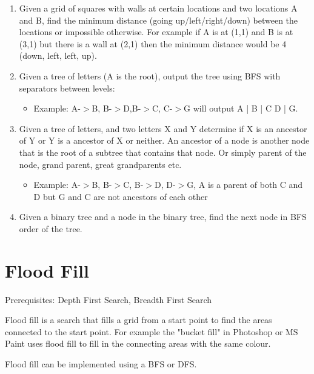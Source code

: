 \documentclass[11pt,oneside]{book}
\begin{document}
\begin{enumerate}
\item Given a grid of squares with walls at certain locations and two locations A and B, find the minimum distance (going up/left/right/down) between the locations or impossible otherwise. For example if A is at (1,1) and B is at (3,1) but there is a wall at (2,1) then the minimum distance would be 4 (down, left, left, up). 
\item Given a tree of letters (A is the root), output the tree using BFS with separators between levels:

\begin{itemize}
\item Example: A-$>$B, B-$>$D,B-$>$C, C-$>$G will output A | B | C D | G.
\end{itemize}
\item Given a tree of letters, and two letters X and Y determine if X is an ancestor of Y or Y is a ancestor of X or neither. An ancestor of a node is another node that is the root of a subtree that contains that node. Or simply parent of the node, grand parent, great grandparents etc.

\begin{itemize}
\item Example: A-$>$B, B-$>$C, B-$>$D, D-$>$G,  A is a parent of both C and D but G and C are not ancestors of each other
\end{itemize}
\item Given a binary tree and a node in the binary tree, find the next node in BFS order of the tree.
\end{enumerate}

        \section{ Flood Fill }
        

Prerequisites: Depth First Search, Breadth First Search

Flood fill is a search that fills a grid from a start point to find the areas connected to the start point. For example the "bucket fill" in Photoshop or MS Paint uses flood fill to fill in the connecting areas with the same colour.

Flood fill can be implemented using a BFS or DFS.
\end{document}
